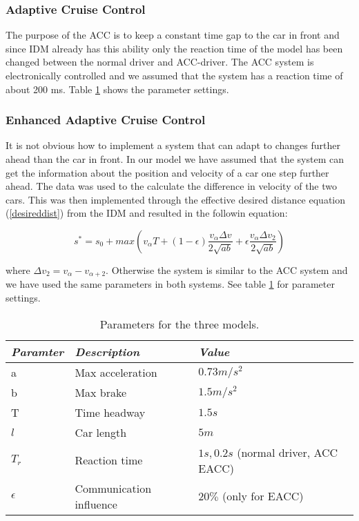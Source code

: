\subsubsection{Adaptive Cruise Control}
The purpose of the ACC is to keep a constant time gap to the car in front
and since IDM already has this ability only the reaction time of the model
has been changed between the normal driver and ACC-driver. The ACC system
is electronically controlled and we assumed that the system has a reaction
time of about 200 ms. Table \ref{config} shows the parameter settings.

\subsubsection{Enhanced Adaptive Cruise Control}
It is not obvious how to implement a system that can adapt to changes further
ahead than the car in front. In our model we have assumed that the system
can get the information about the position and velocity of a car one step further
ahead. The data was used to the calculate the difference
in velocity of the two cars. This was then implemented through the effective desired
distance equation (\ref{desireddist}) from the IDM and resulted in the followin equation:
 
\begin{equation}
s^\ast = s_0 + max \left (v_\alpha T + (1-\epsilon
)\frac{v_\alpha \Delta v}{2\sqrt{ab}} + \epsilon \frac{v_\alpha \Delta
v_2}{2\sqrt{ab}}\right )
\end{equation}

where $ \Delta v_2 = v_\alpha - v_{\alpha +2} $. Otherwise the system is
similar to the ACC system and we have used the same parameters in both
systems. See table \ref{config} for parameter settings.

\begin{center}
\begin{table}[H]
\begin{tabular}{| l | l | l |} \hline
\emph{Paramter} & \emph{Description} & \emph{Value}\\ \hline
a & Max acceleration & $ 0.73 \unit{m/s^2} $\\ \hline
b & Max brake & $ 1.5 \unit{m/s^2} $\\ \hline
T & Time headway & $ 1.5 \unit{s} $ \\ \hline
$ l $ & Car length & $ 5 \unit{m} $ \\ \hline
$ T_r $ & Reaction time & $ 1 \unit{s}, 0.2 \unit{s} $ (normal driver, ACC\/ EACC) \\ \hline
$ \epsilon $ & Communication influence & $ 20 \% $ (only for EACC) \\ \hline
\end{tabular}
\caption{\label{config} Parameters for the three models.}
\end{table}
\end{center}


